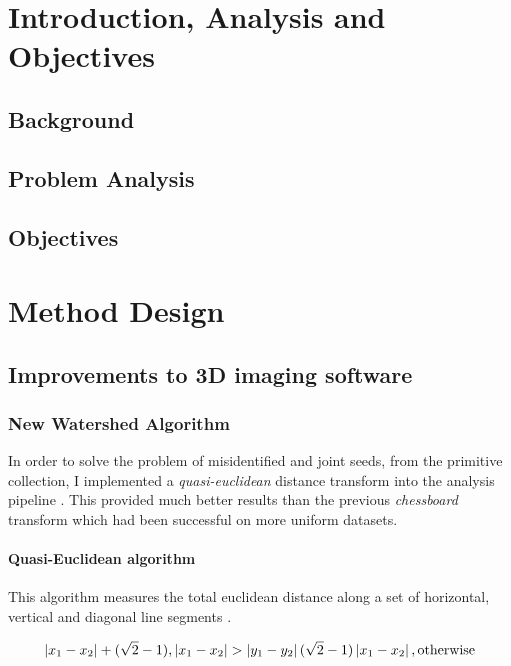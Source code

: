 \documentclass[11pt]{report}
\begin{document}
\chapter{Introduction, Analysis and Objectives}
\label{sec-1}

\section{Background}
\label{sec-1-1}

\section{Problem Analysis}
\label{sec-1-2}

\section{Objectives}
\label{sec-1-3}

\chapter{Method Design}
\label{sec-2}

\section{Improvements to 3D imaging software}
\label{sec-2-1}
\subsection{New Watershed Algorithm}
\label{sec-2-1-1}

In order to solve the problem of misidentified and joint seeds, from the primitive collection,
I implemented a \emph{quasi-euclidean} distance transform into the analysis pipeline \cite{Hughes2017}. This provided much better results than the previous
\emph{chessboard} transform which had been successful on more uniform datasets.

\subsubsection{Quasi-Euclidean algorithm}
\label{sec-2-1-1-1}

This algorithm measures the total euclidean distance along a set of horizontal, vertical and diagonal
line segments \cite{Pfaltz1966}.

\begin{equation}
\label{eqn:qe}
\left | x_1 - x_2 \right | + (\sqrt{2}-1), \left | x_1 - x_2 \right | >\left | y_1 - y_2 \right | (\sqrt{2}-1) \left | x_1 - x_2 \right | ,\textup{otherwise}
\end{equation}
\end{document}

